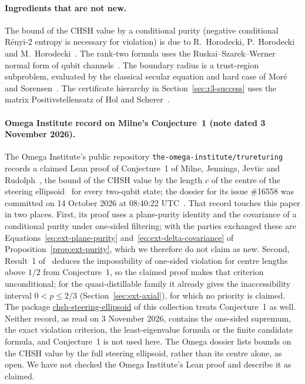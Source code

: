 \documentclass[11pt,a4paper]{article}
\theoremstyle{remark}\newtheorem{remark}[theorem]{Remark}
\begin{document}
\paragraph{Ingredients that are not new.}
The bound of the CHSH value by a conditional purity (negative conditional
R\'enyi-2 entropy is necessary for violation) is due to
R.~Horodecki, P.~Horodecki and M.~Horodecki~\cite{horodecki1996}. The
rank-two formula uses the Ruskai--Szarek--Werner normal form of qubit
channels~\cite{ruskai2002}. The boundary radius is a trust-region
subproblem, evaluated by the classical secular equation and hard case of
Mor\'e and Sorensen~\cite{more}. The certificate hierarchy in
Section~\ref{sec:r3-success} uses the matrix Positivstellensatz of Hol and
Scherer~\cite{holscherer2005}.

\paragraph{Omega Institute record on Milne's Conjecture~1 (note dated 3 November 2026).}
The Omega Institute's public repository
\texttt{the-omega-institute/trureturing} records a claimed Lean proof of
Conjecture~1 of Milne, Jennings, Jevtic and Rudolph~\cite{milne}, the
bound of the CHSH value by the length $c$ of the centre of the steering
ellipsoid~\cite{jevtic} for every two-qubit state; the dossier for its issue \#16558 was committed on
14 October 2026 at 08:40:22 UTC~\cite{dossier}. That record touches this
paper in two places. First, its proof uses a plane-purity identity and the
covariance of a conditional purity under one-sided filtering; with the
parties exchanged these are Equations~\eqref{eq:ext-plane-purity}
and~\eqref{eq:ext-delta-covariance} of Proposition~\ref{prop:ext-purity},
which we therefore do not claim as new. Second, Result~1
of~\cite{ducuara} deduces the impossibility of one-sided violation for
centre lengths above $1/2$ from Conjecture~1, so the claimed proof makes
that criterion unconditional; for the quasi-distillable family it already
gives the inaccessibility interval $0<p\le2/3$ (Section~\ref{sec:ext-axial}),
for which no priority is claimed. The package
\href{https://github.com/dvgyl/math-and-theory/tree/main/papers/physics/chsh-steering-ellipsoid}{chsh-steering-ellipsoid}
of this collection treats Conjecture~1 as well. Neither record, as read on
3 November 2026, contains the one-sided supremum, the exact violation
criterion, the least-eigenvalue formula or the finite candidate formula,
and Conjecture~1 is not used here. The Omega dossier lists bounds on the
CHSH value by the full steering ellipsoid, rather than its centre alone, as
open. We have not checked
the Omega Institute's Lean proof and describe it as claimed.
\end{document}
